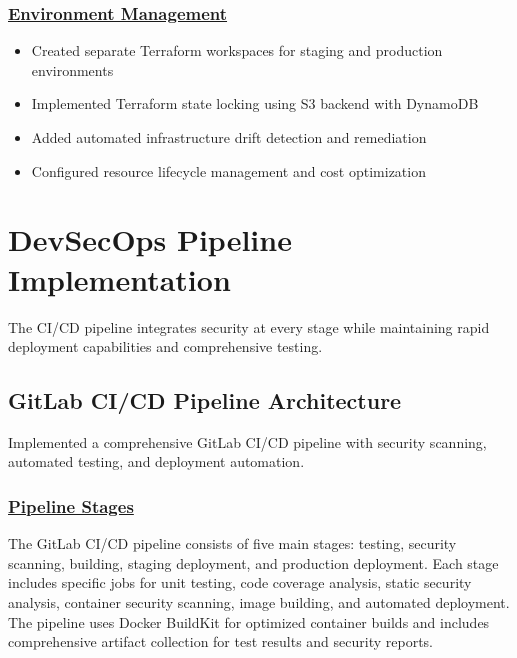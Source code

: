 \subsubsection*{\underline{Environment Management}}
\begin{itemize}
    \item Created separate Terraform workspaces for staging and production environments
    \item Implemented Terraform state locking using S3 backend with DynamoDB
    \item Added automated infrastructure drift detection and remediation
    \item Configured resource lifecycle management and cost optimization
\end{itemize}

\section{DevSecOps Pipeline Implementation}
The CI/CD pipeline integrates security at every stage while maintaining rapid deployment capabilities and comprehensive testing.

\subsection{GitLab CI/CD Pipeline Architecture}
Implemented a comprehensive GitLab CI/CD pipeline with security scanning, automated testing, and deployment automation.

\subsubsection*{\underline{Pipeline Stages}}
The GitLab CI/CD pipeline consists of five main stages: testing, security scanning, building, staging deployment, and production deployment. Each stage includes specific jobs for unit testing, code coverage analysis, static security analysis, container security scanning, image building, and automated deployment. The pipeline uses Docker BuildKit for optimized container builds and includes comprehensive artifact collection for test results and security reports.


